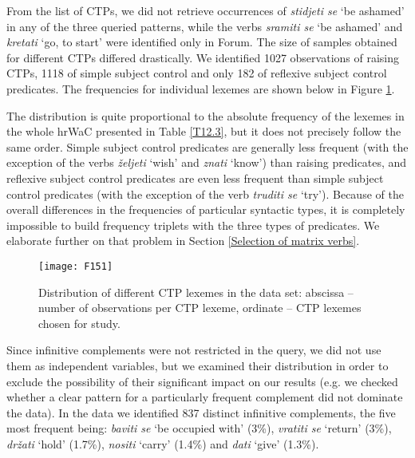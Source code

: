 From the list of CTPs, we did not retrieve occurrences of \textit{stidjeti se} ‘be ashamed’ in any of the three queried patterns, while the verbs \textit{sramiti se} ‘be ashamed’ and \textit{kretati} ‘go, to start’ were identified only in Forum. The size of samples obtained for different CTPs differed drastically. We identified 1027 observations of raising CTPs, 1118 of simple subject control and only 182 of reflexive subject control predicates. The frequencies for individual lexemes are shown below in Figure \ref{F15.1}. 

The distribution is quite proportional to the absolute frequency of the lexemes in the whole hrWaC presented in Table \ref{T12.3}, but it does not precisely follow the same order. Simple subject control predicates are generally less frequent (with the exception of the verbs \textit{željeti} ‘wish’ and \textit{znati} ‘know’) than raising predicates, and reflexive subject control predicates are even less frequent than simple subject control predicates (with the exception of the verb \textit{truditi se} ‘try’). Because of the overall differences in the frequencies of particular syntactic types, it is completely impossible to build frequency triplets with the three types of predicates. We elaborate further on that problem in Section \ref{Selection of matrix verbs}.

\begin{figure}
\caption{Distribution of different CTP lexemes in the data set: abscissa – number of observations per CTP lexeme, ordinate – CTP lexemes chosen for study.}
\label{F15.1}
\texttt{[image: F151]}
\end{figure}

Since infinitive complements were not restricted in the query, we did not use them as independent variables, but we examined their distribution in order to exclude the possibility of their significant impact on our results (e.g. we checked whether a clear pattern for a particularly frequent complement did not dominate the data). In the data we identified 837 distinct infinitive complements, the five most frequent being: \textit{baviti se} ‘be occupied with’ (3\%), \textit{vratiti se} ‘return’ (3\%), \textit{držati} ‘hold’ (1.7\%), \textit{nositi} ‘carry’ (1.4\%) and \textit{dati} ‘give’ (1.3\%).

